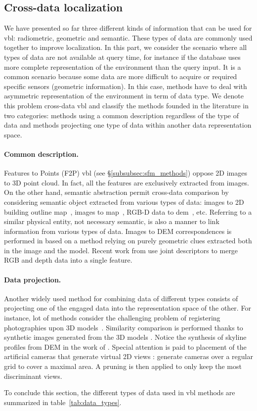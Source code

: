 	\subsection{Cross-data localization}
	\label{subsec:cross_data}        
		We have presented so far three different kinds of information that can be used for \ac{vbl}: radiometric, geometric and semantic. These types of data are commonly used together to improve localization. In this part, we consider the scenario where all types of data are not available at query time, for instance if the database uses more complete representation of the environment than the query input. It is a common scenario because some data are more difficult to acquire or required specific sensors (\eg geometric information). In this case, methods have to deal with asymmetric representation of the environment in term of data type. We denote this problem cross-data \ac{vbl} and classify the methods founded in the literature in two categories: methods using a common description regardless of the type of data and methods projecting one type of data within another data representation space.
		
    	\paragraph{Common description.}
    		Features to Points (F2P) \ac{vbl} (see \S\ref{subsubsec:sfm_methods}) oppose 2D images to 3D point cloud. In fact, all the features are exclusively extracted from images. On the other hand, semantic abstraction permit cross-data comparison by considering semantic object extracted from various types of data: images to 2D building outline map~\citep{Cham2010}, images to map~\citep{Ardeshir2014,Qu2015,Castaldo2015,Brubaker2016}, RGB-D data to \ac{dem}~\citep{Christie2016}, etc. Referring to a similar physical entity, not necessary semantic, is also a manner to link information from various types of data. Images to DEM correspondences is performed in \citep{Bansal2014} based on a method relying on purely geometric clues extracted both in the image and the model. Recent work from \citep{Sizikova2016,Li2017} use joint descriptors to merge RGB and depth data into a single feature.
					
		\paragraph{Data projection.}
			Another widely used method for combining data of different types consists of projecting one of the engaged data into the representation space of the other. For instance, lot of methods consider the challenging problem of registering photographies upon 3D models~\citep{Baatz2012,Kendall2015,Arth2015,Pascoe2015,Pascoe2015a,Pascoe2015b}. Similarity comparison is performed thanks to synthetic images generated from the 3D models \citep{Russell2011,Mason2011,Aubry2014,Poglitsch2015}. Notice the synthesis of skyline profiles from DEM in the work of \citet{Baatz2012}. Special attention is paid to placement of the artificial cameras that generate virtual 2D views \citep{Irschara2009,Gee2012,Torii2015}: \citet{Aubry2014} generate cameras over a regular grid to cover a maximal area. A pruning is then applied to only keep the most discriminant views.

	
	
To conclude this section, the different types of data used in \ac{vbl} methods are summarized in table~\ref{tab:data_types}.

